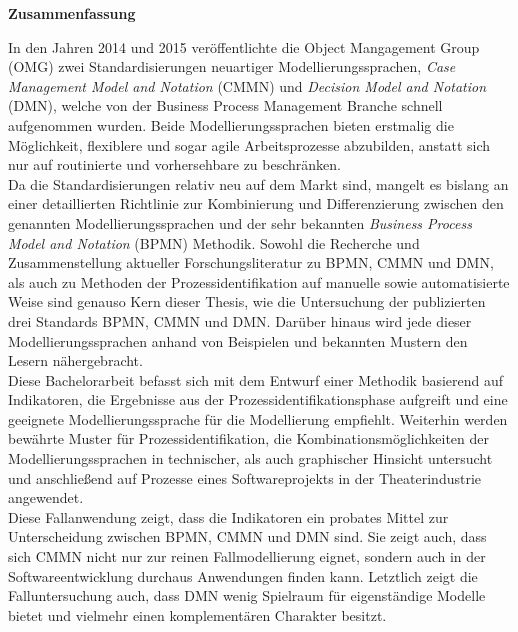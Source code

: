 

\clearemptydoublepage

\vspace*{2cm}
\begin{center}
{\Large \bf Zusammenfassung}
\end{center}
\vspace{1cm}

In den Jahren 2014 und 2015 veröffentlichte die Object Mangagement Group (OMG) zwei Standardisierungen neuartiger Modellierungssprachen, \textit{Case Management Model and Notation} (CMMN) und \textit{Decision Model and Notation} (DMN), welche von der Business Process Management Branche schnell aufgenommen wurden. Beide Modellierungssprachen bieten erstmalig die Möglichkeit, flexiblere und sogar agile Arbeitsprozesse abzubilden, anstatt sich nur auf routinierte und vorhersehbare zu beschränken. \\
Da die Standardisierungen relativ neu auf dem Markt sind, mangelt es bislang an einer detaillierten Richtlinie zur Kombinierung und Differenzierung zwischen den genannten Modellierungssprachen und der sehr bekannten \textit{Business Process Model and Notation} (BPMN) Methodik. 
Sowohl die Recherche und Zusammenstellung aktueller Forschungsliteratur zu BPMN, CMMN und DMN, als auch zu Methoden der Prozessidentifikation auf manuelle sowie automatisierte Weise sind genauso Kern dieser Thesis, wie die Untersuchung der publizierten drei Standards BPMN, CMMN und DMN. Darüber hinaus wird jede dieser Modellierungssprachen anhand von Beispielen und bekannten Mustern den Lesern nähergebracht. \\
Diese Bachelorarbeit befasst sich mit dem Entwurf einer Methodik basierend auf Indikatoren, die Ergebnisse aus der Prozessidentifikationsphase aufgreift und eine geeignete Modellierungssprache für die Modellierung empfiehlt. Weiterhin werden bewährte Muster für Prozessidentifikation, die Kombinationsmöglichkeiten der Modellierungssprachen in technischer, als auch graphischer Hinsicht untersucht und anschließend auf Prozesse eines Softwareprojekts in der Theaterindustrie angewendet. \\
Diese Fallanwendung zeigt, dass die Indikatoren ein probates Mittel zur Unterscheidung zwischen BPMN, CMMN und DMN sind. Sie zeigt auch, dass sich CMMN nicht nur zur reinen Fallmodellierung eignet, sondern auch in der Softwareentwicklung durchaus Anwendungen finden kann. Letztlich zeigt die Falluntersuchung auch, dass DMN wenig Spielraum für eigenständige Modelle bietet und vielmehr einen komplementären Charakter besitzt. 
